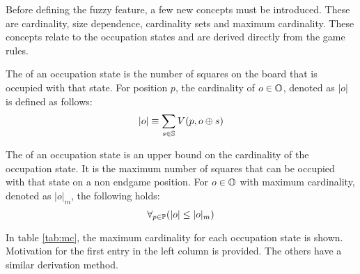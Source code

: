 Before defining the fuzzy feature, a few new concepts must be introduced.  These are cardinality, size dependence, cardinality sets  and maximum cardinality.  These concepts relate to the occupation states and are derived directly from the game rules.

The  of an occupation state is the number of squares on the board that is occupied with that state.  For position $p$, the cardinality of $o \in \mathbb{O}$, denoted as $|o|$ is defined as follows:
\[
	|o| \equiv \sum_{s \in \mathbb{S}} V(p, o \oplus s ) 
\]

The  of an occupation state is an upper bound on the cardinality of the occupation state.  It is the maximum number of squares that can be occupied with that state on a non endgame position. For $o \in \mathbb{O}$  with maximum cardinality, denoted as $|o|_m$, the following holds:
\[
	\forall_{p \in \mathbb{P}} (|o| \leq |o|_m)
\]

In table \ref{tab:mc}, the maximum cardinality for each  occupation state is shown.   Motivation for the
first entry in the left column is provided.  The others have a similar derivation method.

